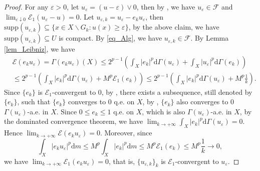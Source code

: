 \documentclass[11pt,a4paper]{article}
\numberwithin{equation}{section}
\theoremstyle{plain}
\theoremstyle{definition}
\begin{document}
\begin{proof}
For any $\varepsilon>0$, let $u_\varepsilon=(u-\varepsilon)\vee0$, then by \cite[Corollary 3.19 (a)]{KS24a}, we have $u_\varepsilon\in\mathcal{F}$ and $\lim_{\varepsilon\downarrow0}\mathcal{E}_1(u_\varepsilon-u)=0$.  Let $u_{\varepsilon,k}=u_\varepsilon-e_ku_\varepsilon$, then $\mathrm{supp}(u_{\varepsilon,k})\subseteq \{x\in X\backslash G_k:u(x)\ge\varepsilon\}$, by the above claim, we have $\mathrm{supp}(u_{\varepsilon,k})\subseteq U$ is compact. By \ref{eq_Alg}, we have $u_{\varepsilon,k}\in\mathcal{F}$. By Lemma \ref{lem_Leibniz}, we have
\begin{align*}
&\mathcal{E}(e_ku_\varepsilon)=\Gamma(e_ku_\varepsilon)(X)\le2^{p-1}\left(\int_X|e_k|^p\mathrm{d}\Gamma(u_\varepsilon)+\int_X|u_\varepsilon|^p\mathrm{d}\Gamma(e_k)\right)\\
&\le2^{p-1}\left(\int_X|e_k|^p\mathrm{d}\Gamma(u_\varepsilon)+M^p\mathcal{E}_1(e_k)\right)\le2^{p-1}\left(\int_X|e_k|^p\mathrm{d}\Gamma(u_\varepsilon)+M^p \frac{1}{k}\right).
\end{align*}
Since $\{e_k\}$ is $\mathcal{E}_1$-convergent to $0$, by \cite[Corollary 8.7]{Yan25a}, there exists a subsequence, still denoted by $\{e_k\}$, such that $\{e_k\}$ converges to $0$ q.e. on $X$, by \cite[Proposition 8.12]{Yan25a}, $\{e_k\}$ also converges to $0$ $\Gamma(u_\varepsilon)$-a.e. in $X$. Since $0\le e_k\le1$ q.e. on $X$, which is also $\Gamma(u_\varepsilon)$-a.e. in $X$, by the dominated convergence theorem, we have $\lim_{k\to+\infty}\int_X|e_k|^p\mathrm{d}\Gamma(u_\varepsilon)=0$. Hence $\lim_{k\to+\infty}\mathcal{E}(e_ku_\varepsilon)=0$. Moreover, since
$$\int_X|e_ku_\varepsilon|^p\mathrm{d} m\le M^p\int_X|e_k|^p\mathrm{d} m\le M^p\mathcal{E}_1(e_k)\le M^p \frac{1}{k}\to0,$$
we have $\lim_{k\to+\infty}\mathcal{E}_1(e_ku_\varepsilon)=0$, that is, $\{u_{\varepsilon,k}\}_{k}$ is $\mathcal{E}_1$-convergent to $u_\varepsilon$.


\end{proof}
\end{document}
